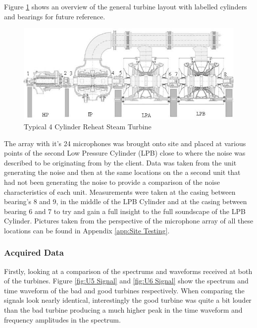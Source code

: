 \documentclass{UoNMCHA}
\numberwithin{equation}{section}
\begin{document}
    Figure \ref{fig:turbine} shows an overview of the general turbine layout with labelled cylinders and bearings for future reference.

    \begin{figure} [H]
        \centering
        \includegraphics[keepaspectratio, width = \textwidth]{Figures/LabelledTurbine.jpg}
        \caption{Typical 4 Cylinder Reheat Steam Turbine \citep{WWH}}
        \label{fig:turbine}
    \end{figure}


    The array with it's 24 microphones was brought onto site and placed at various points of the second Low Pressure Cylinder (LPB) close to where the noise was described to be originating from by the client. Data was taken from the unit generating the noise and then at the same locations on the a second unit that had not been generating the noise to provide a comparison of the noise characteristics of each unit. Measurements were taken at the casing between bearing's 8 and 9, in the middle of the LPB Cylinder and at the casing between bearing 6 and 7 to try and gain a full insight to the full soundscape of the LPB Cylinder. Pictures taken from the perspective of the microphone array of all these locations can be found in Appendix \ref{app:Site Testing}.

    \subsubsection{Acquired Data} \label{sec:Site Acquired Data}

    Firstly, looking at a comparison of the spectrums and waveforms received at both of the turbines. Figure \ref{fig:U5 Signal} and \ref{fig:U6 Signal} show the spectrum and time waveform of the bad and good turbines respectively. When comparing the signals look nearly identical, interestingly the good turbine was quite a bit louder than the bad turbine producing a much higher peak in the time waveform and frequency amplitudes in the spectrum. 
\end{document}
